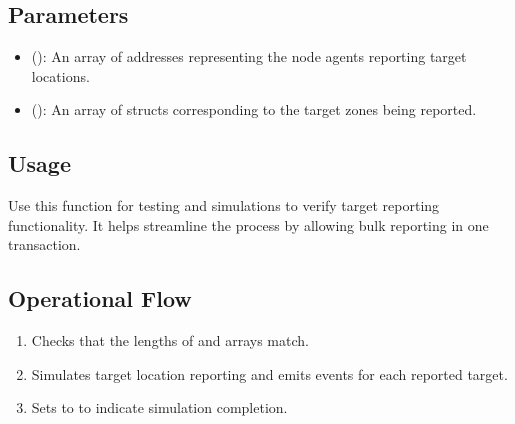 \documentclass[letterpaper,10pt,english]{sphinxmanual}
\begin{document}
\subsection{Parameters}
\label{\detokenize{docs_consensus_mechanism_contract:id7}}\begin{itemize}
\item {} 
\sphinxAtStartPar
{} ():
An array of addresses representing the node agents reporting target locations.

\item {} 
\sphinxAtStartPar
{} ():
An array of  structs corresponding to the target zones being reported.

\end{itemize}


\subsection{Usage}
\label{\detokenize{docs_consensus_mechanism_contract:id8}}
\sphinxAtStartPar
Use this function for testing and simulations to verify target reporting functionality. It helps streamline the process by allowing bulk reporting in one transaction.


\subsection{Operational Flow}
\label{\detokenize{docs_consensus_mechanism_contract:id9}}\begin{enumerate}
%
\item {} 
\sphinxAtStartPar
{} Checks that the lengths of  and  arrays match.

\item {} 
\sphinxAtStartPar
{} Simulates target location reporting and emits  events for each reported target.

\item {} 
\sphinxAtStartPar
{} Sets  to  to indicate simulation completion.

\end{enumerate}
\end{document}
